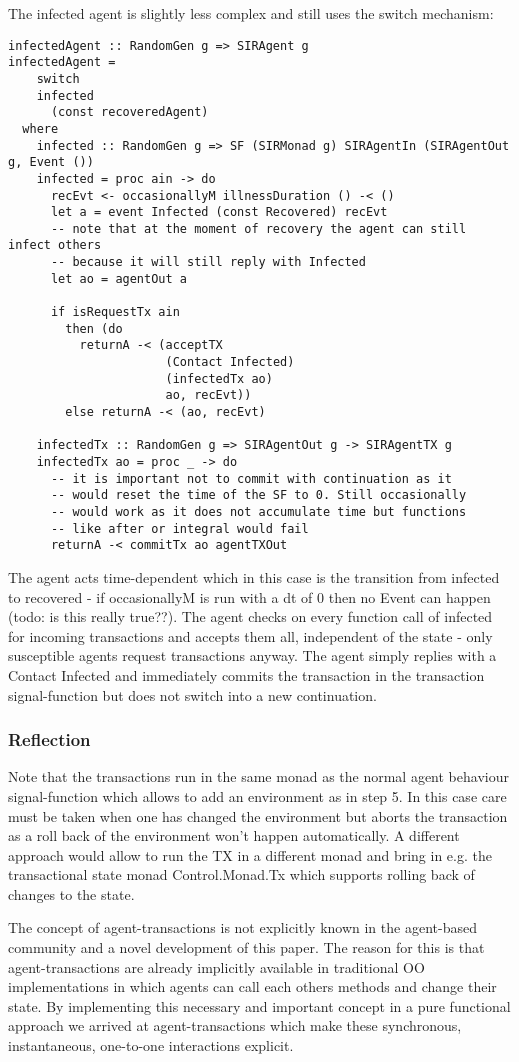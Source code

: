 The infected agent is slightly less complex and still uses the switch mechanism:
\begin{verbatim}
infectedAgent :: RandomGen g => SIRAgent g
infectedAgent = 
    switch
    infected 
      (const recoveredAgent)
  where
    infected :: RandomGen g => SF (SIRMonad g) SIRAgentIn (SIRAgentOut g, Event ())
    infected = proc ain -> do
      recEvt <- occasionallyM illnessDuration () -< ()
      let a = event Infected (const Recovered) recEvt
      -- note that at the moment of recovery the agent can still infect others
      -- because it will still reply with Infected
      let ao = agentOut a

      if isRequestTx ain 
        then (do
          returnA -< (acceptTX 
                      (Contact Infected)
                      (infectedTx ao)
                      ao, recEvt))
        else returnA -< (ao, recEvt)

    infectedTx :: RandomGen g => SIRAgentOut g -> SIRAgentTX g
    infectedTx ao = proc _ -> do
      -- it is important not to commit with continuation as it
      -- would reset the time of the SF to 0. Still occasionally
      -- would work as it does not accumulate time but functions
      -- like after or integral would fail
      returnA -< commitTx ao agentTXOut
\end{verbatim}

The agent acts time-dependent which in this case is the transition from infected to recovered - if occasionallyM is run with a dt of 0 then no Event can happen (todo: is this really true??). The agent checks on every function call of infected for incoming transactions and accepts them all, independent of the state - only susceptible agents request transactions anyway. The agent simply replies with a Contact Infected and immediately commits the transaction in the transaction signal-function but does not switch into a new continuation.

\subsubsection{Reflection}
Note that the transactions run in the same monad as the normal agent behaviour signal-function which allows to add an environment as in step 5. In this case care must be taken when one has changed the environment but aborts the transaction as a roll back of the environment won't happen automatically. A different approach would allow to run the TX in a different monad and bring in e.g. the  transactional state monad Control.Monad.Tx which supports rolling back of changes to the state.

The concept of agent-transactions is not explicitly known in the agent-based community and a novel development of this paper. The reason for this is that agent-transactions are already implicitly available in traditional OO implementations in which agents can call each others methods and change their state. By implementing this necessary and important concept in a pure functional approach we arrived at agent-transactions which make these synchronous, instantaneous, one-to-one interactions explicit.
